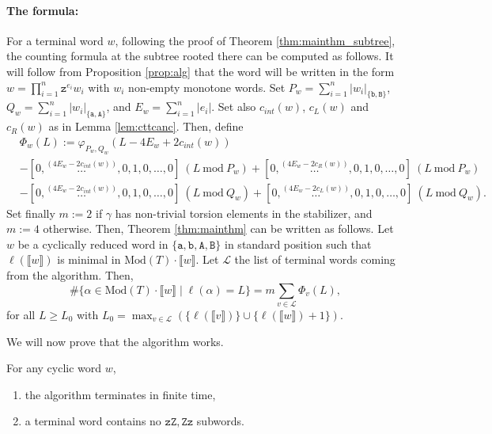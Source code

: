 \documentclass{article}
\begin{document}
	\paragraph{The formula:} For a terminal word $w$, following the proof of Theorem \ref{thm:mainthm_subtree}, the counting formula at the subtree rooted there can be computed as follows. It will follow from Proposition \ref{prop:alg} that the word will be written in the form $w=\prod_{i=1}^n\mathtt{z}^{e_i}w_i$ with $w_i$ non-empty monotone words. Set $P_w=\sum_{i=1}^n|w_i|_{\{\mathtt{b},\mathtt{B}\}}$, $Q_w=\sum_{i=1}^n|w_i|_{\{\mathtt{a},\mathtt{A}\}}$, and $E_w=\sum_{i=1}^n |e_i|$. Set also $c_{int}(w)$, $c_{L}(w)$ and $c_{R}(w)$ as in Lemma \ref{lem:cttcanc}. Then, define
	{\small\begin{align*}&\Phi_w(L):=\varphi_{P_w,Q_w}(L-4E_w+2c_{int}(w))\\&-[0,\overset{(4E_w-2c_{int}(w))}{\hdots},0,1,0,\hdots,0]\ (L\ \mathrm{mod} \ P_w)+[0,\overset{(4E_w-2c_{R}(w))}{\hdots},0,1,0,\hdots,0]\ (L\ \mathrm{mod} \ P_w) \\
			&-[0,\overset{(4E_w-2c_{int}(w))}{\hdots},0,1,0,\hdots,0]\ (L\ \mathrm{mod} \ Q_w)+[0,\overset{(4E_w-2c_{L}(w))}{\hdots},0,1,0,\hdots,0]\ (L\ \mathrm{mod} \ Q_w).
	\end{align*}}
	Set finally $m:=2$ if $\gamma$ has non-trivial torsion elements in the stabilizer, and $m:=4$ otherwise. Then, Theorem \ref{thm:mainthm} can be written as follows. Let $w$ be a cyclically reduced word in $\{\mathtt{a},\mathtt{b},\mathtt{A},\mathtt{B}\}$ in standard position such that $\ell(\llbracket w\rrbracket)$ is minimal in $\mathrm{Mod}(T)\cdot \llbracket w\rrbracket$. Let $\mathcal{L}$ the list of terminal words coming from the algorithm. Then, 
	\[
	\#\{\alpha\in\mathrm{Mod}(T)\cdot \llbracket w\rrbracket\mid \ell(\alpha)=L\}=m\sum_{v\in\mathcal{L}}\Phi_v(L),
	\]
	for all $L\geq L_0$ with $L_0=\max_{v\in\mathcal{L}}(\{\ell(\llbracket v\rrbracket)\}\cup\{\ell(\llbracket w\rrbracket)+1\})$.
	
	
	\hfill
	
	We will now prove that the algorithm works.
	\begin{proposition}\label{prop:alg} For any cyclic word $w$,
		\begin{enumerate}
			\item \label{prop:algorithm}the algorithm terminates in finite time,
			\item \label{nopanic} a terminal word contains no $\mathtt{zZ},\mathtt{Zz}$ subwords.
		\end{enumerate}
	\end{proposition}
	
\end{document}
